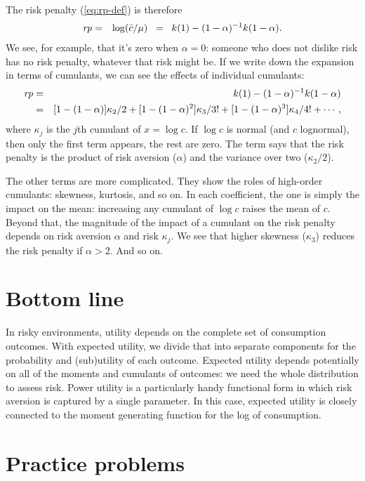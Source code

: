 \documentclass[11pt]{article}
\newcommand{\rp}{\mbox{\it rp\/}}
\newcommand{\cbar}{\bar{c}}
\begin{document}
The risk penalty (\ref{eq:rp-def}) is therefore
\begin{eqnarray*}
    \rp &=& \log (\cbar/\mu)  \;\;=\;\; k(1) - (1-\alpha)^{-1} k(1-\alpha) .
\end{eqnarray*}
We see, for example, that it's zero when $\alpha = 0$:
someone who does not dislike risk has no risk penalty,
whatever that risk might be.
If we write down the expansion in terms of cumulants,
we can see the effects of individual cumulants:
\begin{eqnarray}
    \rp &=& k(1) - (1-\alpha)^{-1} k(1-\alpha) \nonumber \\
        &=& [1-(1-\alpha)] \kappa_2/2 + [1- (1-\alpha)^2] \kappa_3/3!
            + [1- (1-\alpha)^3] \kappa_4/4! + \cdots ,
        \label{eq:rp-cum-expansion}
\end{eqnarray}
where $\kappa_j$ is the $j$th cumulant of $x = \log c$.
If $\log c$ is normal (and $c$ lognormal), then only the first term appears,
the rest are zero.
The term says that the risk penalty is the product of risk aversion ($\alpha$)
and the variance over two ($\kappa_2/2$).

The other terms are more complicated.
They show the roles of high-order cumulants:  skewness, kurtosis, and so on.
In each coefficient, the one is simply the impact on the mean:
increasing any cumulant of $\log c$ raises the mean of $c$.
Beyond that, the magnitude of the impact of a cumulant
on the risk penalty depends on risk aversion $\alpha$ and risk $\kappa_j$.
We see that higher skewness ($\kappa_3$) reduces the risk penalty if $\alpha > 2$.
And so on.


\section*{Bottom line}

In risky environments, utility depends
on the complete set of consumption outcomes.
With expected utility, we divide that into separate components
for the probability and (sub)utility of each outcome.
Expected utility depends potentially on all of the moments and cumulants
of outcomes:
we need the whole distribution to assess risk.
Power utility is a particularly handy functional form
in which risk aversion is captured by a single parameter.
In this case, expected utility is closely connected to the
moment generating function for the log of consumption.

\section*{Practice problems}
\end{document}
